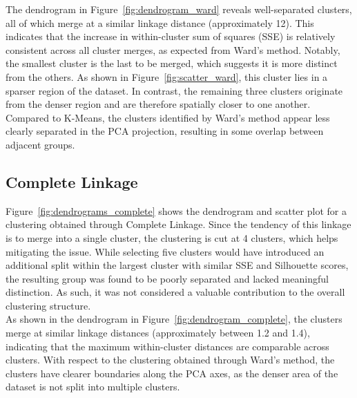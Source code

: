 The dendrogram in Figure~\ref{fig:dendrogram_ward} reveals well-separated clusters, all of which merge at a
similar linkage distance (approximately 12). This indicates that the increase in within-cluster sum of
squares (SSE) is relatively consistent across all cluster merges, as expected from Ward's method.
Notably, the smallest cluster is the last to be merged, which suggests it is more distinct from the others.
As shown in Figure~\ref{fig:scatter_ward}, this cluster lies in a sparser region of the dataset.
In contrast, the remaining three clusters originate from the denser region and are therefore spatially
closer to one another.
Compared to K-Means, the clusters identified by Ward's method appear less clearly separated in the PCA
projection, resulting in some overlap between adjacent groups.



\subsection{Complete Linkage}
Figure~\ref{fig:dendrograms_complete} shows the dendrogram and scatter plot for a clustering obtained
through Complete Linkage.
Since the tendency of this linkage is to merge into a single cluster, the clustering is cut at 4 clusters,
which helps mitigating the issue. While selecting five clusters would have introduced an additional split
within the largest cluster with similar SSE and Silhouette scores, the resulting group was found to be
poorly separated and lacked meaningful distinction.
As such, it was not considered a valuable contribution to the overall clustering structure.\\

As shown in the dendrogram in Figure~\ref{fig:dendrogram_complete}, the clusters merge at similar linkage
distances (approximately between 1.2 and 1.4), indicating that the maximum within-cluster distances are
comparable across clusters. With respect to the clustering obtained through Ward's method, the clusters
have clearer boundaries along the PCA axes, as the denser area of the dataset is not split into multiple
clusters.\\

